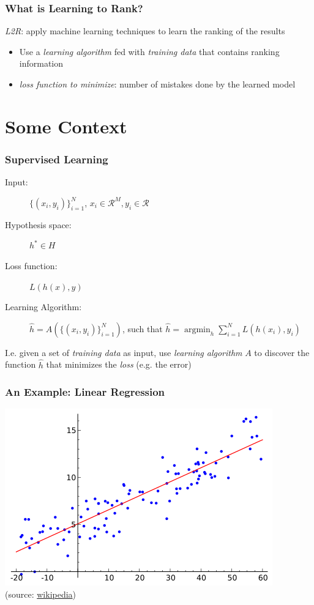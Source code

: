 \documentclass{beamer}
\newcommand{\hh}{\hat{h}}
\DeclareMathOperator*{\argmin}{argmin}
\begin{document}
\begin{frame}
    \frametitle{What is Learning to Rank?}
    \emph{L2R}: apply machine learning techniques to learn the ranking of the
    results
    \begin{itemize}
    \item Use a \emph{learning algorithm} fed with \emph{training data} that
        contains ranking information
    \item \emph{loss function to minimize}: number of mistakes done by the
        learned model
    \end{itemize}
\end{frame}

\section{Some Context}

\begin{frame}
    \frametitle{Supervised Learning}
    \begin{description}
    \item[Input:] $\{(x_i,y_i)\}_{i=1}^N$, $x_i \in \mathcal{R}^M, y_i \in
        \mathcal{R}$
    \item[Hypothesis space:] $h^* \in H$
    \item[Loss function:] $L(h(x),y)$
    \item[Learning Algorithm:] $\hh = A(\{(x_i,y_i)\}_{i=1}^N)$, such that $\hh
        = \argmin_h \sum_{i=1}^N L(h(x_i),y_i)$
    \end{description}
    \vfill %
    I.e. given a set of \emph{training data} as input, use \emph{learning
      algorithm} $A$ to discover the function $\hh$ that minimizes the
    \emph{loss} (e.g. the error) %
    \vfill
\end{frame}

\begin{frame}
    \frametitle{An Example: Linear Regression}
    \includegraphics[width=\textwidth]{Linear_regression}\\
    \hfill\footnotesize (source: \href{http://en.wikipedia.org/wiki/Linear_regression}{wikipedia})
\end{frame}
\end{document}
